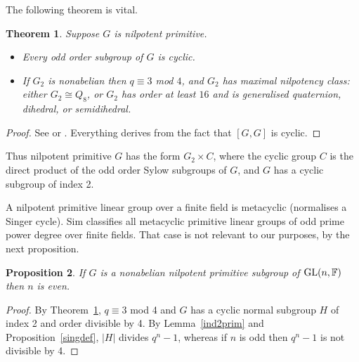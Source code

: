 \documentclass[12pt]{amsart}
\newtheorem{theorem}{Theorem}[section]
\newtheorem{proposition}[theorem]{Proposition}
\theoremstyle{definition}
\theoremstyle{remark}
\begin{document}
 The following theorem 
 is vital.
\begin{theorem}
\label{konzal}
 Suppose $G$ is nilpotent primitive.  
\begin{itemize}
\item[{\rm (i)}] Every odd order subgroup of $G$ is cyclic.
\item[{\rm (ii)}] If $G_2$ is nonabelian then 
 $q\equiv 3$ mod $4$, and $G_2$ has maximal nilpotency 
 class: either $G_2 \cong Q_8$,
 or $G_2$ has order at least $16$ 
 and is generalised quaternion, 
 dihedral, or semidihedral. 
\end{itemize}
\end{theorem}
\begin{proof}
 See \cite{Zalesskii}
 or \cite{Konyuh}. 
 Everything  derives from the fact that $[G,G]$ is cyclic.
\end{proof}
 
 Thus nilpotent primitive $G$ has the form $G_2 \times C$, 
 where the cyclic group $C$ is the direct product of the odd 
 order Sylow subgroups of $G$, and $G$ has a cyclic subgroup 
 of index 2. 

 A nilpotent primitive linear group over a finite field is 
 metacyclic (normalises a Singer cycle). Sim \cite{Sim} 
 classifies all metacyclic primitive linear groups of odd 
 prime power degree over finite fields. That case is not 
 relevant to our purposes, by the next proposition. 
\begin{proposition}
\label{oddfact}
 If $G$ is a  nonabelian nilpotent primitive subgroup
 of ${\rm GL}(n , \mathbb{F})$ then $n$ is even.
\end{proposition}
\begin{proof}
 By Theorem~\ref{konzal}, $q\equiv 3$ mod 4
 and $G$ has a cyclic normal subgroup $H$ 
 of index 2 and order divisible by 4. 
 By Lemma~\ref{ind2prim} and Proposition~\ref{singdef}, 
 $|H|$ divides $q^n-1$, whereas if $n$ is odd 
 then $q^n-1$ is not divisible by 4.
\end{proof}
\end{document}
